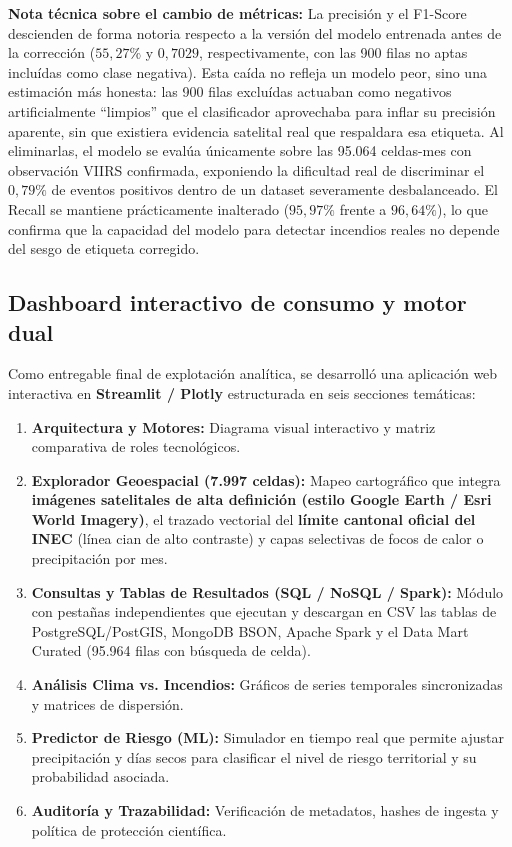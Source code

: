 \documentclass[11pt,a4paper]{article}
\begin{document}
\noindent\textbf{Nota t\'ecnica sobre el cambio de m\'etricas:} La precisi\'on y el F1-Score descienden de forma notoria respecto a la versi\'on del modelo entrenada antes de la correcci\'on ($55{,}27\%$ y $0{,}7029$, respectivamente, con las 900 filas no aptas inclu\'idas como clase negativa). Esta ca\'ida no refleja un modelo peor, sino una estimaci\'on m\'as honesta: las 900 filas exclu\'idas actuaban como negativos artificialmente ``limpios'' que el clasificador aprovechaba para inflar su precisi\'on aparente, sin que existiera evidencia satelital real que respaldara esa etiqueta. Al eliminarlas, el modelo se eval\'ua \'unicamente sobre las 95.064 celdas-mes con observaci\'on VIIRS confirmada, exponiendo la dificultad real de discriminar el $0{,}79\%$ de eventos positivos dentro de un dataset severamente desbalanceado. El Recall se mantiene pr\'acticamente inalterado ($95{,}97\%$ frente a $96{,}64\%$), lo que confirma que la capacidad del modelo para detectar incendios reales no depende del sesgo de etiqueta corregido.

\subsection{Dashboard interactivo de consumo y motor dual}
Como entregable final de explotaci\'on anal\'itica, se desarroll\'o una aplicaci\'on web interactiva en \textbf{Streamlit / Plotly} estructurada en seis secciones tem\'aticas:
\begin{enumerate}
    \item \textbf{Arquitectura y Motores:} Diagrama visual interactivo y matriz comparativa de roles tecnol\'ogicos.
    \item \textbf{Explorador Geoespacial (7.997 celdas):} Mapeo cartogr\'afico que integra \textbf{im\'agenes satelitales de alta definici\'on (estilo Google Earth / Esri World Imagery)}, el trazado vectorial del \textbf{l\'imite cantonal oficial del INEC} (l\'inea cian de alto contraste) y capas selectivas de focos de calor o precipitaci\'on por mes.
    \item \textbf{Consultas y Tablas de Resultados (SQL / NoSQL / Spark):} M\'odulo con pesta\~nas independientes que ejecutan y descargan en CSV las tablas de PostgreSQL/PostGIS, MongoDB BSON, Apache Spark y el Data Mart Curated (95.964 filas con b\'usqueda de celda).
    \item \textbf{An\'alisis Clima vs. Incendios:} Gr\'aficos de series temporales sincronizadas y matrices de dispersi\'on.
    \item \textbf{Predictor de Riesgo (ML):} Simulador en tiempo real que permite ajustar precipitaci\'on y d\'ias secos para clasificar el nivel de riesgo territorial y su probabilidad asociada.
    \item \textbf{Auditor\'ia y Trazabilidad:} Verificaci\'on de metadatos, hashes de ingesta y pol\'itica de protecci\'on cient\'ifica.
\end{enumerate}
\end{document}

